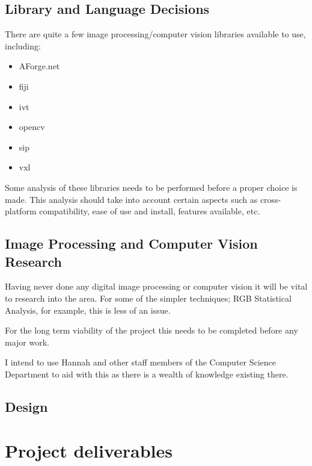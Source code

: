 \documentclass[11pt,fleqn,twoside]{article}
\begin{document}
\subsection{Library and Language Decisions}
There are quite a few image processing/computer vision libraries available to use, including:

\begin{itemize}
\item AForge.net
\item \gls{fiji}
\item \gls{ivt}
\item \gls{opencv}
\item \gls{sip}
\item \gls{vxl}
\end{itemize}

Some analysis of these libraries needs to be performed before a proper choice is made. This analysis should take into account certain aspects such as cross-platform compatibility, ease of use and install, features available, etc.


\subsection{Image Processing and Computer Vision Research}
Having never done any digital image processing or computer vision it will be vital to research into the area. For some of the simpler techniques; RGB Statistical Analysis, for example, this is less of an issue. 

For the long term viability of the project this needs to be completed before any major work.

I intend to use Hannah and other staff members of the Computer Science Department to aid with this as there is a wealth of knowledge existing there.


\subsection{Design}



\section{Project deliverables}
\end{document}
